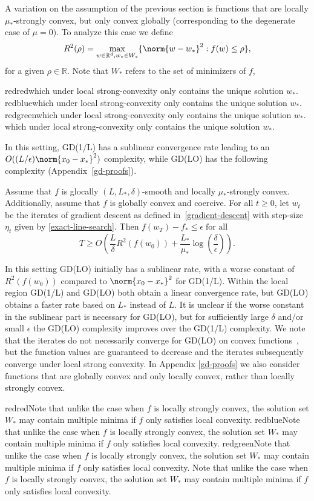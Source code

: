 \documentclass[10pt]{article} %
\newif\ifshowcolours
\def\red{red}
\def\blue{blue}
\def\green{green}
\renewcommand{\textcolor}[2]{%
  \ifshowcolours
    {\color{#1}#2}%
  \else
    \def\temp{#1}%
    \ifx\temp\red     #2\else
    \ifx\temp\blue    #2\else
    \ifx\temp\green   #2\else
        {\color{#1}#2}%
    \fi\fi\fi
  \fi
}
\begin{document}
A variation on the assumption of the previous section is functions that are locally $\mu_*$-strongly convex, but only convex globally (corresponding to the degenerate case of $\mu=0$). 
To analyze this case we define~\citep{nesterov2012cd, beck2013convergence}
\[R^2(\rho) = \max_{w \in \mathbb{R}^d, w_{*} \in W_{*}}  \{\norm{w - w_{*}}^2 : f(w) \leq \rho\},\]
for a given $\rho \in \mathbb{R}$. Note that $W_{*}$ refers to the set of minimizers of $f$, \textcolor{red}{which under local strong-convexity only contains the unique solution $w_*$.}
%  
In this setting, GD(1/L) has a sublinear convergence rate leading to an $O((L/\epsilon)\norm{x_0 - x_*}^2)$ complexity, while 
GD(LO) has the following complexity (Appendix~\ref{gd-proofs}).
\begin{theorem}
    \label{global-convex-local-PL-theorem}
    Assume that $f$ is glocally $(L, L_*, \delta)$-smooth and locally $\mu_*$-strongly convex. Additionally, assume that $f$ is globally convex and coercive. For all $t \geq 0$, let $w_t$ be the iterates of gradient descent as defined in~\eqref{gradient-descent} with step-size $\eta_t$ given by \eqref{exact-line-search}. Then $f(w_T) - f_* \leq \epsilon \;\text{for all}$
    \begin{equation*}
     T \geq O\left(\frac{L}{\delta}R^2(f(w_{0})) + \frac{L_*}{\mu_*}\log\left(\frac{\delta}{\epsilon}\right)\right).
    \end{equation*}
\end{theorem}
In this setting GD(LO) initially has a sublinear rate, with a worse constant of $R^2(f(w_0))$ compared to $\norm{x_0-x_*}^2$ for GD(1/L). Within the local region GD(1/L) and GD(LO) both obtain a linear convergence rate, but GD(LO) obtains a faster rate based on $L_*$ instead of $L$. It is unclear if the worse constant in the sublinear part is necessary for GD(LO), but for sufficiently large $\delta$ and/or small $\epsilon$ the GD(LO) complexity improves over the GD(1/L) complexity.
We note that the iterates do not necessarily converge for GD(LO) on convex functions~\cite{bolte2022curiosities}, but the function values are guaranteed to decrease and the iterates subsequently converge under local strong convexity. In Appendix \ref{gd-proofs} we also consider functions that are globally convex and only locally convex, rather than locally strongly convex. \textcolor{red}{Note that unlike the case when $f$ is locally strongly convex, the solution set $W_*$ may contain multiple minima if $f$ only satisfies local convexity.}
\end{document}
